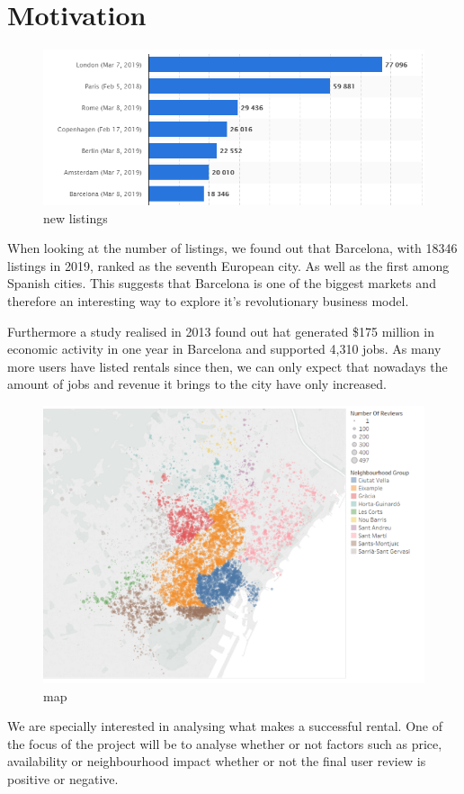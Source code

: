 

\section{Motivation}%
\label{sec:motivation}

\begin{figure}[H]
    \centering
    \includegraphics[width=0.8\linewidth]{images/listingplot}
    \caption{ new listings}%
    \label{fig:airbnblistingsPlot.PNG}
\end{figure}

When looking at the number of \airbnb listings, we found out that Barcelona, with 18346 listings in 2019, ranked as the seventh European city. As well as the first among Spanish cities. This suggests that Barcelona is one of the biggest \airbnb markets and therefore an interesting way to explore it's revolutionary business model.

Furthermore a study realised in 2013 found out hat \airbnb generated \$175 million in economic activity in one year in Barcelona and supported 4,310 jobs. \cite{economy} As many more users have listed rentals since then, we can only expect that nowadays the amount of jobs and revenue it brings to the city have only increased.

\begin{figure}[H]
    \centering
    \includegraphics[width=0.8\linewidth]{images/airbnbMap}
    \caption{\airbnb map}%
    \label{fig:airbnbMap.PNG}
\end{figure}

We are specially interested in analysing what makes a successful \airbnb rental. One of the focus of the project will be to analyse whether or not factors such as price, availability or neighbourhood impact whether or not the final user review is positive or negative. 

